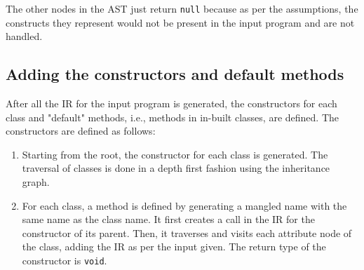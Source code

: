 \documentclass{article}
\begin{document}
The other nodes in the AST just return \verb|null| because as per the assumptions, the constructs they represent would not be present in the input program and are not handled.

\subsection{Adding the constructors and default methods}
After all the IR for the input program is generated, the constructors for each class and "default" methods, i.e., methods in in-built classes, are defined. The constructors are defined as follows:
\begin{enumerate}
	\item Starting from the root, the constructor for each class is generated. The traversal of classes is done in a depth first fashion using the inheritance graph.
	\item For each class, a method is defined by generating a mangled name with the same name as the class name. It first creates a call in the IR for the constructor of its parent. Then, it traverses and visits each attribute node of the class, adding the IR as per the input given. The return type of the constructor is \verb|void|.
\end{enumerate}
\end{document}

